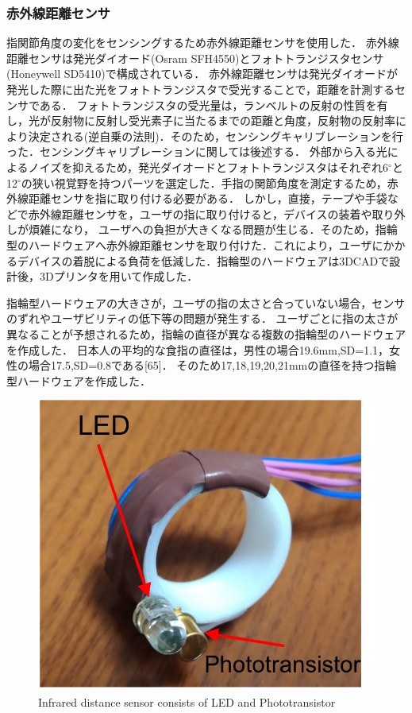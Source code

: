 \subsubsection*{赤外線距離センサ}
指関節角度の変化をセンシングするため赤外線距離センサを使用した．
赤外線距離センサは発光ダイオード(Osram SFH4550)とフォトトランジスタセンサ(Honeywell SD5410)で構成されている．
赤外線距離センサは発光ダイオードが発光した際に出た光をフォトトランジスタで受光することで，距離を計測するセンサである．
フォトトランジスタの受光量は，ランベルトの反射の性質を有し，光が反射物に反射し受光素子に当たるまでの距離と角度，反射物の反射率により決定される(逆自乗の法則)．そのため，センシングキャリブレーションを行った．センシングキャリブレーションに関しては後述する．
外部から入る光によるノイズを抑えるため，発光ダイオードとフォトトランジスタはそれぞれ6$^\circ$と12$^\circ$の狭い視覚野を持つパーツを選定した．手指の関節角度を測定するため，赤外線距離センサを指に取り付ける必要がある．
しかし，直接，テープや手袋などで赤外線距離センサを，ユーザの指に取り付けると，デバイスの装着や取り外しが煩雑になり，
ユーザへの負担が大きくなる問題が生じる．そのため，指輪型のハードウェアへ赤外線距離センサを取り付けた．これにより，ユーザにかかるデバイスの着脱による負荷を低減した．指輪型のハードウェアは3DCADで設計後，3Dプリンタを用いて作成した．

指輪型ハードウェアの大きさが，ユーザの指の太さと合っていない場合，センサのずれやユーザビリティの低下等の問題が発生する．
ユーザごとに指の太さが異なることが予想されるため，指輪の直径が異なる複数の指輪型のハードウェアを作成した．
日本人の平均的な食指の直径は，男性の場合19.6mm,SD=1.1，女性の場合17.5,SD=0.8である[65]．
そのため17,18,19,20,21mmの直径を持つ指輪型ハードウェアを作成した．

\begin{figure}[H]
  \centering
  \includegraphics[width=0.8\linewidth]{fig/ring_led}
  \caption{Infrared distance sensor consists of LED and Phototransistor}
  \label{fig:distance sensor}
\end{figure}

